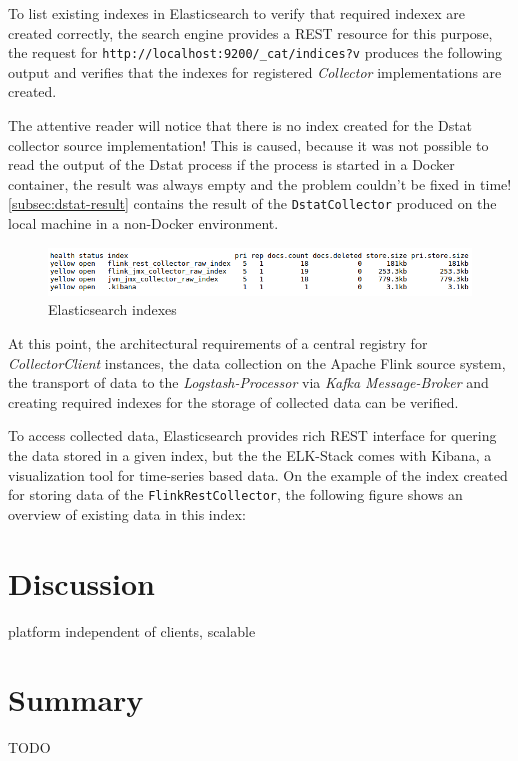 To list existing indexes in Elasticsearch to verify that required indexex are created correctly, the search engine provides a
REST resource for this purpose, the request for \verb|http://localhost:9200/_cat/indices?v| produces the following output and verifies
that the indexes for registered \textit{Collector} implementations are created.

The attentive reader will notice that there is no index created for the Dstat collector source implementation! This is caused, because
it was not possible to read the output of the Dstat process if the process is started in a Docker container, the result was always empty
and the problem couldn't be fixed in time! \autoref{subsec:dstat-result} contains the result of the \verb|DstatCollector| produced
on the local machine in a non-Docker environment.
\begin{figure}[H]
	\centering
	\includegraphics[width=1.0\textwidth]{../images/12-indexes.png}
	\caption{Elasticsearch indexes}
	\label{fig:indexes}
\end{figure}

At this point, the architectural requirements of a central registry for \textit{CollectorClient} instances, the data collection on the
Apache Flink source system, the transport of data to the \textit{Logstash-Processor} via \textit{Kafka Message-Broker} and creating required
indexes for the storage of collected data can be verified.

To access collected data, Elasticsearch provides rich REST interface for quering the data stored in a given index, but the the ELK-Stack
comes with Kibana, a visualization tool for time-series based data. On the example of the index created for storing data of the
\verb|FlinkRestCollector|, the following figure shows an overview of existing data in this index:


%
%

\section{Discussion}

platform independent of clients, scalable
\section{Summary}

TODO

